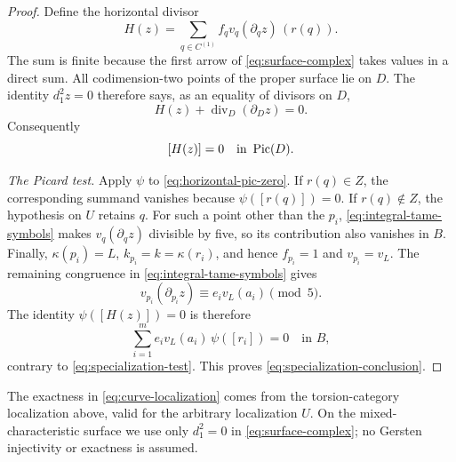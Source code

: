 \begin{proof}
Define the horizontal divisor
\begin{equation}\label{eq:horizontal-divisor}
 H(z)=\sum_{q\in C^{(1)}}f_qv_q(\partial_qz)\,(r(q)).
\end{equation}
The sum is finite because the first arrow of \eqref{eq:surface-complex}
takes values in a direct sum.  All codimension-two points of the proper
surface lie on $D$.  The identity $d_1^2z=0$ therefore says, as an equality
of divisors on $D$,
\[
 H(z)+\operatorname{div}_D(\partial_Dz)=0.
\]
Consequently
\begin{equation}\label{eq:horizontal-pic-zero}
 [H(z)]=0\quad\text{in }\operatorname{Pic}(D).
\end{equation}

\smallskip\noindent\emph{The Picard test.}
Apply $\psi$ to \eqref{eq:horizontal-pic-zero}.  If $r(q)\in Z$, the
corresponding summand vanishes because $\psi([r(q)])=0$.  If
$r(q)\notin Z$, the hypothesis on $U$ retains $q$.  For such a point other
than the $p_i$, \eqref{eq:integral-tame-symbols} makes
$v_q(\partial_qz)$ divisible by five, so its contribution also vanishes in
$B$.  Finally, $\kappa(p_i)=L$, $k_{p_i}=k=\kappa(r_i)$, and hence
$f_{p_i}=1$ and $v_{p_i}=v_L$.  The remaining congruence in
\eqref{eq:integral-tame-symbols} gives
\[
 v_{p_i}(\partial_{p_i}z)\equiv e_i v_L(a_i)\pmod5.
\]
The identity $\psi([H(z)])=0$ is therefore
\[
 \sum_{i=1}^m e_i v_L(a_i)\,\psi([r_i])=0\quad\text{in }B,
\]
contrary to \eqref{eq:specialization-test}.  This proves
\eqref{eq:specialization-conclusion}.
\end{proof}

\begin{remark}
\label{rem:no-gersten}
The exactness in \eqref{eq:curve-localization} comes from the torsion-category
localization above, valid for the arbitrary localization $U$.
On the mixed-characteristic surface we use only $d_1^2=0$ in
\eqref{eq:surface-complex}; no Gersten injectivity or exactness is assumed.
\end{remark}
